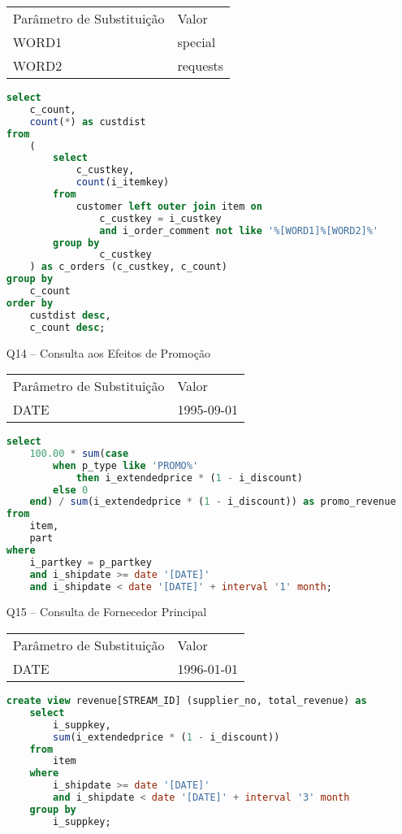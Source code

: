 \begin{enumerate}
\begin{tabular}{ll}
	Parâmetro de Substituição & Valor\\
	WORD1 & special\\
	WORD2 & requests\\
\end{tabular}

	\begin{lstlisting}[language=SQL]
select
    c_count,
    count(*) as custdist
from
    (
        select
            c_custkey,
            count(i_itemkey)
        from
            customer left outer join item on
                c_custkey = i_custkey
                and i_order_comment not like '%[WORD1]%[WORD2]%'
        group by
                c_custkey
    ) as c_orders (c_custkey, c_count)
group by
    c_count
order by
    custdist desc,
    c_count desc;
	\end{lstlisting}

\item[Q14 --] Consulta aos Efeitos de Promoção

\begin{tabular}{ll}
	Parâmetro de Substituição & Valor\\
	DATE & 1995-09-01\\
\end{tabular}

	\begin{lstlisting}[language=SQL]
select
	100.00 * sum(case
		when p_type like 'PROMO%'
			then i_extendedprice * (1 - i_discount)
		else 0
	end) / sum(i_extendedprice * (1 - i_discount)) as promo_revenue
from
	item,
	part
where
	i_partkey = p_partkey
	and i_shipdate >= date '[DATE]'
	and i_shipdate < date '[DATE]' + interval '1' month;
	\end{lstlisting}

\item[Q15 --] Consulta de Fornecedor Principal

\begin{tabular}{ll}
	Parâmetro de Substituição & Valor\\
	DATE & 1996-01-01\\
\end{tabular}

	\begin{lstlisting}[language=SQL]
create view revenue[STREAM_ID] (supplier_no, total_revenue) as
	select
		i_suppkey,
		sum(i_extendedprice * (1 - i_discount))
	from
		item
	where
		i_shipdate >= date '[DATE]'
		and i_shipdate < date '[DATE]' + interval '3' month
	group by
		i_suppkey;


\end{lstlisting}
\end{enumerate}

